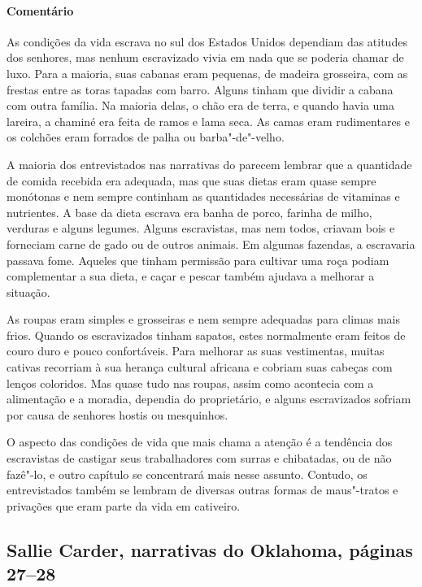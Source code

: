 \paragraph{Comentário}\quad
{\small
As condições da vida escrava no sul dos Estados Unidos
dependiam das atitudes dos senhores, mas nenhum escravizado vivia em nada
que se poderia chamar de luxo. Para a maioria, suas cabanas
eram pequenas, de madeira grosseira, com as frestas entre as toras
tapadas com barro. Alguns tinham que dividir a cabana com outra
família. Na maioria delas, o chão era de terra, e quando havia uma
lareira, a chaminé era feita de ramos e lama seca. As camas eram
rudimentares e os colchões eram forrados de palha ou barba"-de"-velho.

A maioria dos entrevistados nas narrativas do  parecem lembrar que a
quantidade de comida recebida era adequada, mas que suas dietas eram
quase sempre monótonas e nem sempre continham as quantidades necessárias
de vitaminas e nutrientes. A base da dieta escrava era
banha de porco, farinha de milho, verduras e alguns legumes. Alguns
escravistas, mas nem todos, criavam bois e forneciam carne de gado ou de
outros animais. Em algumas fazendas, a escravaria passava fome. Aqueles
que tinham permissão para cultivar uma roça podiam complementar a sua
dieta, e caçar e pescar também ajudava a melhorar a situação.

As roupas eram simples e grosseiras e nem sempre adequadas para
climas mais frios. Quando os escravizados tinham sapatos, estes normalmente
eram feitos de couro duro e pouco confortáveis. Para melhorar as suas
vestimentas, muitas cativas recorriam à sua herança cultural africana e
cobriam suas cabeças com lenços coloridos. Mas quase tudo nas roupas,
assim como acontecia com a alimentação e a moradia, dependia do
proprietário, e alguns escravizados sofriam por causa de senhores hostis ou
mesquinhos.

O aspecto das condições de vida que mais chama a atenção é a
tendência dos escravistas de castigar seus trabalhadores com surras e
chibatadas, ou de não fazê"-lo, e outro capítulo se concentrará mais
nesse assunto. Contudo, os entrevistados também se lembram de diversas outras
formas de maus"-tratos e privações que eram parte da vida em cativeiro.
}

\subsection{Sallie Carder, narrativas do Oklahoma, páginas 27--28} \label{ref48}

